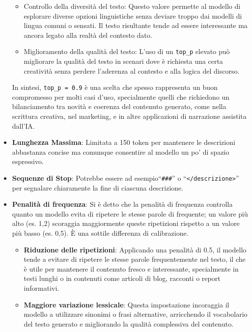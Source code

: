 \begin{itemize}
\begin{itemize}
                \item Controllo della diversità del testo: Questo valore permette al modello di esplorare diverse opzioni linguistiche senza deviare troppo dai modelli di lingua comuni o sensati. Il testo risultante tende ad essere interessante ma ancora legato alla realtà del contesto dato.  
                \item Miglioramento della qualità del testo: L'uso di un \texttt{top\_p} elevato può migliorare la qualità del testo in scenari dove è richiesta una certa creatività senza perdere l'aderenza al contesto e alla logica del discorso. 
            \end{itemize}
        
            In sintesi, \texttt{top\_p = 0.9} è una scelta che spesso rappresenta un buon compromesso per molti casi d'uso, specialmente quelli che richiedono un bilanciamento tra novità e coerenza del contenuto generato, come nella scrittura creativa, nel marketing, e in altre applicazioni di narrazione assistita dall'IA. 
        
        \item
            \textbf{Lunghezza Massima}: Limitata a 150 token per mantenere le descrizioni abbastanza concise ma comunque consentire al modello un po’ di spazio espressivo. 
        
        \item
            \textbf{Sequenze di Stop}: Potrebbe essere ad esempio``\texttt{\#\#\#}'' o ``\texttt{</descrizione>}'' per segnalare chiaramente la fine di ciascuna descrizione. 
        
        \item
            \textbf{Penalità di frequenza}: Si è detto che la penalità di frequenza controlla quanto un modello evita di ripetere le stesse parole di frequente; un valore più alto (es. 1,2) scoraggia maggiormente queste ripetizioni rispetto a un valore più basso (es. 0,5). È una sottile differenza di calibrazione. 
            \begin{itemize}
                \item \textbf{Riduzione delle ripetizioni}: Applicando una penalità di 0.5, il modello tende a evitare di ripetere le stesse parole frequentemente nel testo, il che è utile per mantenere il contenuto fresco e interessante, specialmente in testi lunghi o in contenuti come articoli di blog, racconti o report informativi. 
                
                \item \textbf{Maggiore variazione lessicale}: Questa impostazione incoraggia il modello a utilizzare sinonimi o frasi alternative, arricchendo il vocabolario del testo generato e migliorando la qualità complessiva del contenuto. 
                

\end{itemize}
\end{itemize}
